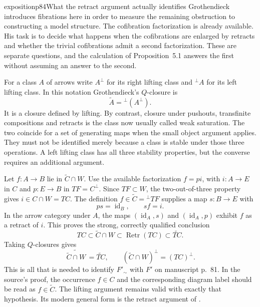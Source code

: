 
\begin{dcomment}{exposition}{p84}{What the retract argument actually identifies}
Grothendieck introduces fibrations here in order to measure the remaining obstruction to constructing a model structure. The cofibration factorization is already available. His task is to decide what happens when the cofibrations are enlarged by retracts and whether the trivial cofibrations admit a second factorization. These are separate questions, and the calculation of Proposition~5.1 answers the first without assuming an answer to the second.

For a class $A$ of arrows write $A^{\perp}$ for its right lifting class and ${}^{\perp}A$ for its left lifting class. In this notation Grothendieck's $Q$-closure is
\[
 \widetilde A={}^{\perp}(A^{\perp}).
\]
It is a closure defined by lifting. By contrast, closure under pushouts, transfinite compositions and retracts is the class now usually called weak saturation. The two coincide for a set of generating maps when the small object argument applies. They must not be identified merely because a class is stable under those three operations. A left lifting class has all three stability properties, but the converse requires an additional argument.

Let $f:A\to B$ lie in $\widetilde C\cap W$. Use the available factorization $f=pi$, with $i:A\to E$ in $C$ and $p:E\to B$ in $TF=C^{\perp}$. Since $TF\subset W$, the two-out-of-three property gives $i\in C\cap W=TC$. The definition $f\in\widetilde C={}^{\perp}TF$ supplies a map $s:B\to E$ with
\[
 ps=\operatorname{id}_B,\qquad sf=i.
\]
In the arrow category under $A$, the maps $(\operatorname{id}_A,s)$ and $(\operatorname{id}_A,p)$ exhibit $f$ as a retract of $i$. This proves the strong, correctly qualified conclusion
\[
 TC\subset\widetilde C\cap W
       \subset\operatorname{Retr}(TC)
       \subset\widetilde{TC}.
\]
Taking $Q$-closures gives
\[
 \widetilde{\,\widetilde C\cap W\,}=\widetilde{TC},
 \qquad (\widetilde C\cap W)^{\perp}=(TC)^{\perp}.
\]
This is all that is needed to identify $F'_{\sim}$ with $F'$ on manuscript p.~81. In the source's proof, the occurrence $f\in C$ and the corresponding diagram label should be read as $f\in\widetilde C$. The lifting argument remains valid with exactly that hypothesis. Its modern general form is the retract argument of \citet[Lemma~11.2.3]{Riehl2014}.


\end{dcomment}
